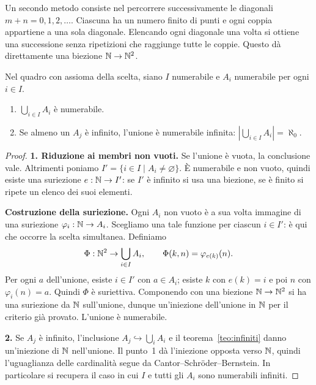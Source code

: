\begin{osservazione}
Un secondo metodo consiste nel percorrere successivamente le diagonali $m+n=0,1,2,\ldots$. Ciascuna ha un numero finito di punti e ogni coppia appartiene a una sola diagonale. Elencando ogni diagonale una volta si ottiene una successione senza ripetizioni che raggiunge tutte le coppie. Questo dà direttamente una biezione $\mathbb{N}\to\mathbb{N}^2$.
\end{osservazione}

\begin{schema}
\end{schema}

\begin{teorema}\label{teo:unione-numerabile}
Nel quadro con assioma della scelta, siano $I$ numerabile e $A_i$ numerabile per ogni $i\in I$.
\begin{enumerate}[label=\arabic*.]
\item $\bigcup_{i\in I}A_i$ è numerabile.
\item Se almeno un $A_j$ è infinito, l'unione è numerabile infinita: $|\bigcup_{i\in I}A_i|=\aleph_0$.
\end{enumerate}
\end{teorema}
\begin{proof}
\textbf{1. Riduzione ai membri non vuoti.} Se l'unione è vuota, la conclusione vale. Altrimenti poniamo $I'=\{i\in I\mid A_i\ne\varnothing\}$. È numerabile e non vuoto, quindi esiste una suriezione $e:\mathbb{N}\to I'$: se $I'$ è infinito si usa una biezione, se è finito si ripete un elenco dei suoi elementi.

\textbf{Costruzione della suriezione.} Ogni $A_i$ non vuoto è a sua volta immagine di una suriezione $\varphi_i:\mathbb{N}\to A_i$. Scegliamo una tale funzione per ciascun $i\in I'$: è qui che occorre la scelta simultanea. Definiamo
\[
\Phi:\mathbb{N}^2\to\bigcup_{i\in I}A_i,\qquad \Phi(k,n)=\varphi_{e(k)}(n).
\]
Per ogni $a$ dell'unione, esiste $i\in I'$ con $a\in A_i$; esiste $k$ con $e(k)=i$ e poi $n$ con $\varphi_i(n)=a$. Quindi $\Phi$ è suriettiva. Componendo con una biezione $\mathbb{N}\to\mathbb{N}^2$ si ha una suriezione da $\mathbb{N}$ sull'unione, dunque un'iniezione dell'unione in $\mathbb{N}$ per il criterio già provato. L'unione è numerabile.

\textbf{2.} Se $A_j$ è infinito, l'inclusione $A_j\hookrightarrow\bigcup_i A_i$ e il teorema~\ref{teo:infiniti} danno un'iniezione di $\mathbb{N}$ nell'unione. Il punto~1 dà l'iniezione opposta verso $\mathbb{N}$, quindi l'uguaglianza delle cardinalità segue da Cantor--Schröder--Bernstein. In particolare si recupera il caso in cui $I$ e tutti gli $A_i$ sono numerabili infiniti.
\end{proof}

